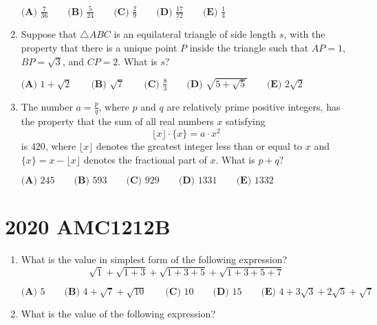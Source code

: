 \documentclass{article}
\begin{document}
\begin{enumerate}[label=\arabic*., itemsep=0.5em]
\(\textbf{(A) } \frac{7}{36} \qquad\textbf{(B) } \frac{5}{24} \qquad\textbf{(C) } \frac{2}{9} \qquad\textbf{(D) } \frac{17}{72} \qquad\textbf{(E) } \frac{1}{4}\)\par \vspace{0.5em}\item Suppose that \(\triangle ABC\) is an equilateral triangle of side length \(s\), with the property that there is a unique point \(P\) inside the triangle such that \(AP = 1\), \(BP = \sqrt{3}\), and \(CP = 2\). What is \(s?\)

\(\textbf{(A) } 1 + \sqrt{2} \qquad \textbf{(B) } \sqrt{7} \qquad \textbf{(C) } \frac{8}{3} \qquad \textbf{(D) } \sqrt{5 + \sqrt{5}} \qquad \textbf{(E) } 2\sqrt{2}\)\par \vspace{0.5em}\item The number \(a = \tfrac{p}{q}\), where \(p\) and \(q\) are relatively prime positive integers, has the property that the sum of all real numbers \(x\) satisfying
\begin{equation*}
\lfloor x \rfloor \cdot \{x\} = a \cdot x^2
\end{equation*}
is \(420\), where \(\lfloor x \rfloor\) denotes the greatest integer less than or equal to \(x\) and \(\{x\} = x - \lfloor x \rfloor\) denotes the fractional part of \(x\). What is \(p + q?\)

\(\textbf{(A) } 245 \qquad \textbf{(B) } 593 \qquad \textbf{(C) } 929 \qquad \textbf{(D) } 1331 \qquad \textbf{(E) } 1332\)\par \vspace{0.5em}\end{enumerate}\newpage\section*{2020 AMC1212B}\begin{enumerate}[label=\arabic*., itemsep=0.5em]\item What is the value in simplest form of the following expression?
\begin{equation*}
\sqrt{1} + \sqrt{1+3} + \sqrt{1+3+5} + \sqrt{1+3+5+7}
\end{equation*}


\(\textbf{(A) }5 \qquad \textbf{(B) }4 + \sqrt{7} + \sqrt{10} \qquad \textbf{(C) } 10 \qquad \textbf{(D) } 15 \qquad \textbf{(E) } 4 + 3\sqrt{3} + 2\sqrt{5} + \sqrt{7}\)\par \vspace{0.5em}\item What is the value of the following expression?


\end{enumerate}
\end{document}

